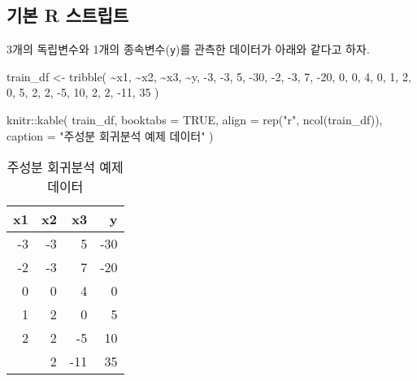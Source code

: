 \documentclass[
]{book}
\newenvironment{Shaded}{\begin{snugshade}}{\end{snugshade}}
\newcommand{\AttributeTok}[1]{\textcolor[rgb]{0.77,0.63,0.00}{#1}}
\newcommand{\ConstantTok}[1]{\textcolor[rgb]{0.00,0.00,0.00}{#1}}
\newcommand{\DecValTok}[1]{\textcolor[rgb]{0.00,0.00,0.81}{#1}}
\newcommand{\FunctionTok}[1]{\textcolor[rgb]{0.00,0.00,0.00}{#1}}
\newcommand{\NormalTok}[1]{#1}
\newcommand{\OtherTok}[1]{\textcolor[rgb]{0.56,0.35,0.01}{#1}}
\newcommand{\SpecialCharTok}[1]{\textcolor[rgb]{0.00,0.00,0.00}{#1}}
\newcommand{\StringTok}[1]{\textcolor[rgb]{0.31,0.60,0.02}{#1}}
\begin{document}
\hypertarget{pcr-basic-script}{%
\subsection{기본 R 스트립트}\label{pcr-basic-script}}

3개의 독립변수와 1개의 종속변수(\texttt{y})를 관측한 데이터가 아래와 같다고 하자.

\begin{Shaded}
\begin{Highlighting}[]
\NormalTok{train\_df }\OtherTok{\textless{}{-}} \FunctionTok{tribble}\NormalTok{(}
  \SpecialCharTok{\textasciitilde{}}\NormalTok{x1, }\SpecialCharTok{\textasciitilde{}}\NormalTok{x2, }\SpecialCharTok{\textasciitilde{}}\NormalTok{x3, }\SpecialCharTok{\textasciitilde{}}\NormalTok{y,}
  \SpecialCharTok{{-}}\DecValTok{3}\NormalTok{, }\SpecialCharTok{{-}}\DecValTok{3}\NormalTok{, }\DecValTok{5}\NormalTok{, }\SpecialCharTok{{-}}\DecValTok{30}\NormalTok{,}
  \SpecialCharTok{{-}}\DecValTok{2}\NormalTok{, }\SpecialCharTok{{-}}\DecValTok{3}\NormalTok{, }\DecValTok{7}\NormalTok{, }\SpecialCharTok{{-}}\DecValTok{20}\NormalTok{,}
  \DecValTok{0}\NormalTok{, }\DecValTok{0}\NormalTok{, }\DecValTok{4}\NormalTok{, }\DecValTok{0}\NormalTok{,}
  \DecValTok{1}\NormalTok{, }\DecValTok{2}\NormalTok{, }\DecValTok{0}\NormalTok{, }\DecValTok{5}\NormalTok{,}
  \DecValTok{2}\NormalTok{, }\DecValTok{2}\NormalTok{, }\SpecialCharTok{{-}}\DecValTok{5}\NormalTok{, }\DecValTok{10}\NormalTok{,}
  \DecValTok{2}\NormalTok{, }\DecValTok{2}\NormalTok{, }\SpecialCharTok{{-}}\DecValTok{11}\NormalTok{, }\DecValTok{35}
\NormalTok{)}

\NormalTok{knitr}\SpecialCharTok{::}\FunctionTok{kable}\NormalTok{(}
\NormalTok{  train\_df, }\AttributeTok{booktabs =} \ConstantTok{TRUE}\NormalTok{,}
  \AttributeTok{align =} \FunctionTok{rep}\NormalTok{(}\StringTok{"r"}\NormalTok{, }\FunctionTok{ncol}\NormalTok{(train\_df)),}
  \AttributeTok{caption =} \StringTok{"주성분 회귀분석 예제 데이터"}
\NormalTok{)}
\end{Highlighting}
\end{Shaded}

\begin{table}

\caption{\label{tab:pcr-example-data}주성분 회귀분석 예제 데이터}
\centering
\begin{tabular}[t]{rrrr}
\toprule
x1 & x2 & x3 & y\\
\midrule
-3 & -3 & 5 & -30\\
-2 & -3 & 7 & -20\\
0 & 0 & 4 & 0\\
1 & 2 & 0 & 5\\
2 & 2 & -5 & 10\\
\addlinespace
2 & 2 & -11 & 35\\
\bottomrule
\end{tabular}
\end{table}
\end{document}

